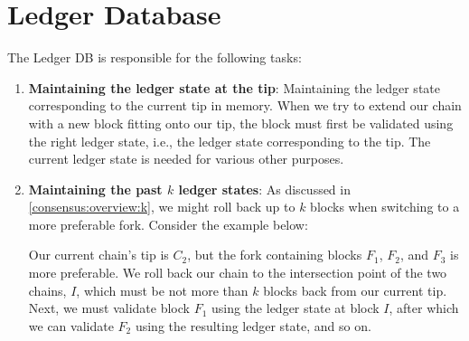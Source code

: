 \chapter{Ledger Database}
\label{ledgerdb}

The Ledger DB is responsible for the following tasks:

\begin{enumerate}
\item \textbf{Maintaining the ledger state at the tip}: Maintaining the ledger
  state corresponding to the current tip in memory. When we try to extend our
  chain with a new block fitting onto our tip, the block must first be validated
  using the right ledger state, i.e., the ledger state corresponding to the tip.
  The current ledger state is needed for various other purposes.

\item \textbf{Maintaining the past $k$ ledger states}: As discussed in
  \cref{consensus:overview:k}, we might roll back up to $k$ blocks when
  switching to a more preferable fork. Consider the example below:
  \begin{center}
  \end{center}
  Our current chain's tip is $C_2$, but the fork containing blocks $F_1$, $F_2$,
  and $F_3$ is more preferable. We roll back our chain to the intersection point
  of the two chains, $I$, which must be not more than $k$ blocks back from our
  current tip. Next, we must validate block $F_1$ using the ledger state at
  block $I$, after which we can validate $F_2$ using the resulting ledger state,
  and so on.


\end{enumerate}

